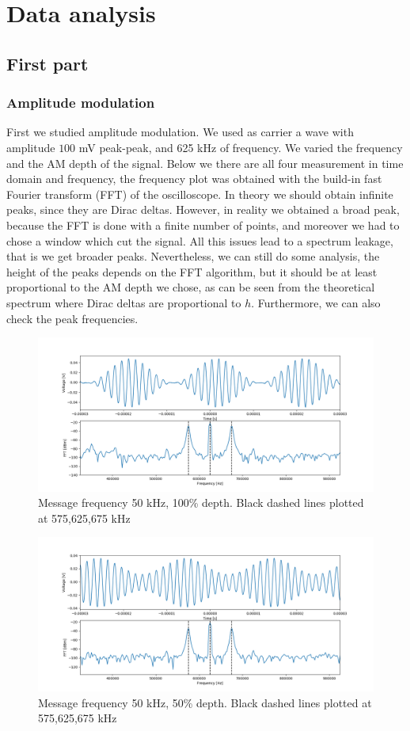 \documentclass[a4paper,10pt]{article}
\begin{document}
\section{Data analysis}
\subsection{First part}
\subsubsection{Amplitude modulation}
First we studied amplitude modulation. We used as carrier a wave with amplitude $100$ mV peak-peak, and 625 kHz of frequency. We varied the frequency and the AM depth of the signal. Below we there are all four measurement in time domain and frequency, the frequency plot was obtained with the build-in fast Fourier transform (FFT) of the oscilloscope. In theory we should obtain infinite peaks, since they are Dirac deltas. However, in reality we obtained a broad peak, because the FFT is done with a finite number of points, and moreover we had to chose a window which cut the signal. All this issues lead to a spectrum leakage, that is we get broader peaks. Nevertheless, we can still do some analysis, the height of the peaks depends on the FFT algorithm, but it should be at least proportional to the AM depth we chose, as can be seen from the theoretical spectrum where Dirac deltas are proportional to $h$. Furthermore, we can also check the peak frequencies.
\begin{figure}[H]
\centering
\includegraphics[width=\textwidth]{amp1}
\caption{Message frequency 50 kHz, 100\% depth. Black dashed lines plotted at 575,625,675 kHz}\label{1}
\end{figure}
\begin{figure}[H]
\centering
\includegraphics[width=\textwidth]{amp2}
\caption{Message frequency 50 kHz, 50\% depth. Black dashed lines plotted at 575,625,675 kHz}\label{2}
\end{figure}
\end{document}
